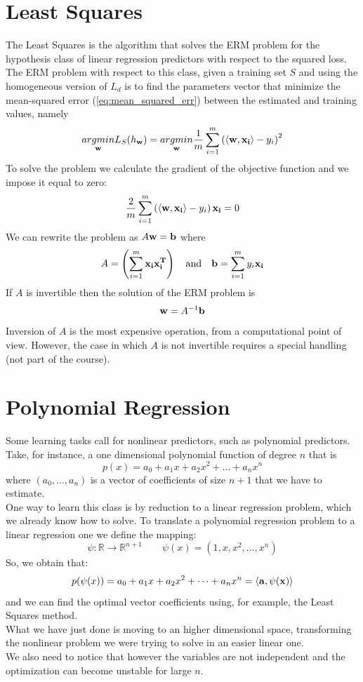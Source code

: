 \documentclass[12pt]{report}
\theoremstyle{plain}
\newcommand\sprod[2]{\langle \vb{#1},\vb{#2}\rangle}
\begin{document}
\begin{flushleft}
\section{Least Squares}
The Least Squares is the algorithm that solves the ERM problem for the 
hypothesis class of linear regression predictors with respect to the squared 
loss. The ERM problem with respect to this class, given a training set $S$ and 
using the homogeneous version of $L_d$ is to find the parameters vector that 
minimize the mean-squared error (\ref{eq:mean_squared_err}) between the 
estimated and training values, namely
\[ \underset{\vb{w}}{argmin} L_S(h_{\vb{w}}) = 
\underset{\vb{w}}{argmin}\frac{1}{m}\sum_{i=1}^m\left(\sprod{w}{x_i}-y_i\right)^2
 \]
To solve the problem we calculate the gradient of the objective function and we 
impose it equal to zero:
\[ \frac{2}{m}\sum_{i=1}^m\left(\sprod{w}{x_i}-y_i\right)\vb{x_i}=0 \]
We can rewrite the problem as $A\vb{w}=\vb{b}$ where
\[ 
A=\left(\sum_{i=1}^m\vb{x_i}\vb{x_i^T}\right)\quad\text{and}\quad\vb{b}=\sum_{i=1}^m
y_i\vb{x_i} \] 
If $A$ is invertible then the solution of the ERM problem is 
\[ \vb{w}=A^{-1}\vb{b} \]
Inversion of $A$ is the most expensive operation, from a computational point of 
view. However, the case in which $A$ is not invertible requires a special 
handling (not part of the course).

\section{Polynomial Regression}
Some learning tasks call for nonlinear predictors, such as polynomial 
predictors. Take, for instance, a one dimensional polynomial function of degree 
$n$ that is
\[ p(x)=a_0+a_1x+a_2x^2+\dots +a_nx^n \]
where $(a_0,\dots,a_n)$ is a vector of coefficients of size $n+1$ that we have 
to estimate.\\
One way to learn this class is by reduction to a linear regression problem, 
which we already know how to solve. To translate a polynomial regression 
problem to a linear regression one we define the mapping:
\[ \psi:\mathds{R}\to\mathds{R}^{n+1} \qquad \psi(x)=(1,x,x^2,\dots,x^n) \]
So, we obtain that:
\[ p(\psi(x))=a_0+a_1x+a_2x^2+\dots+a_nx^n=\sprod{a}{\psi(x)} \] 
and we can find the optimal vector coefficients using, for example, the Least 
Squares method.\\
What we have just done is moving to an higher dimensional space, transforming 
the nonlinear problem we were trying to solve in an easier linear one.\\
We also need to notice that however the variables are not independent and the 
optimization can become unstable for large $n$.


\end{flushleft}
\end{document}
